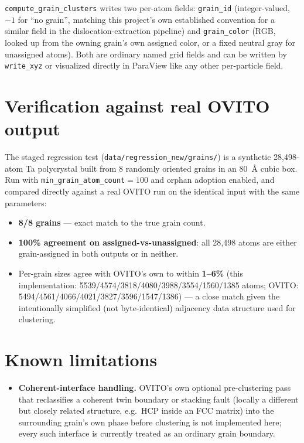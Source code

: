 \documentclass[11pt,a4paper]{article}
\newcommand{\op}[1]{\texttt{#1}}
\newcommand{\field}[1]{\texttt{#1}}
\begin{document}
\op{compute\_grain\_clusters} writes two per-atom fields: \field{grain\_id} (integer-valued,
$-1$ for ``no grain'', matching this project's own established convention for a similar field in
the dislocation-extraction pipeline) and \field{grain\_color} (RGB, looked up from the owning
grain's own assigned color, or a fixed neutral gray for unassigned atoms). Both are ordinary named
grid fields and can be written by \op{write\_xyz} or visualized directly in ParaView like any other
per-particle field.

\section{Verification against real OVITO output}

The staged regression test (\texttt{data/regression\_new/grains/}) is a synthetic 28{,}498-atom Ta
polycrystal built from 8 randomly oriented grains in an 80~\AA{} cubic box. Run with
\field{min\_grain\_atom\_count}$=100$ and orphan adoption enabled, and compared directly against a
real OVITO run on the identical input with the same parameters:

\begin{itemize}[nosep]
  \item \textbf{8/8 grains} — exact match to the true grain count.
  \item \textbf{100\% agreement on assigned-vs-unassigned}: all 28{,}498 atoms are either
    grain-assigned in both outputs or in neither.
  \item Per-grain sizes agree with OVITO's own to within \textbf{1--6\%}
    (this implementation: 5539/4574/3818/4080/3988/3554/1560/1385 atoms;
    OVITO: 5494/4561/4066/4021/3827/3596/1547/1386) — a close match given the intentionally
    simplified (not byte-identical) adjacency data structure used for clustering.
\end{itemize}

\section{Known limitations}

\begin{itemize}[nosep]
  \item \textbf{Coherent-interface handling.} OVITO's own optional pre-clustering pass that
    reclassifies a coherent twin boundary or stacking fault (locally a different but closely
    related structure, e.g.\ HCP inside an FCC matrix) into the surrounding grain's own phase
    before clustering is not implemented here; every such interface is currently treated as an
    ordinary grain boundary.
\end{itemize}
\end{document}
